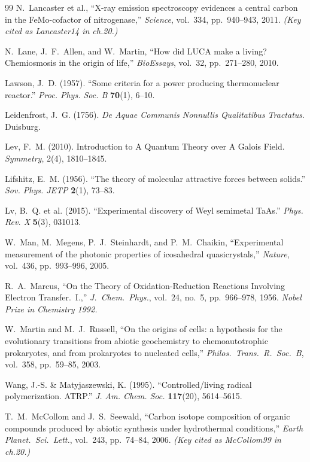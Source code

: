 \documentclass[12pt,oneside]{book}
\theoremstyle{principia}
\theoremstyle{definition}
\theoremstyle{remark}
\begin{document}
\begin{thebibliography}{99}
N.~Lancaster et al.,
``X-ray emission spectroscopy evidences a central carbon in the FeMo-cofactor of nitrogenase,''
\emph{Science}, vol.~334, pp.~940--943, 2011.
\textit{(Key cited as Lancaster14 in ch.20.)}

N.~Lane, J.~F.~Allen, and W.~Martin,
``How did LUCA make a living? Chemiosmosis in the origin of life,''
\emph{BioEssays}, vol.~32, pp.~271--280, 2010.

Lawson, J.~D. (1957).
``Some criteria for a power producing thermonuclear reactor.''
\textit{Proc. Phys. Soc. B} \textbf{70}(1), 6--10.

Leidenfrost, J.~G. (1756).
\textit{De Aquae Communis Nonnullis Qualitatibus Tractatus}. Duisburg.

Lev, F.~M. (2010).
Introduction to A Quantum Theory over A Galois Field.
\textit{Symmetry}, 2(4), 1810--1845.

Lifshitz, E.~M. (1956).
``The theory of molecular attractive forces between solids.''
\textit{Sov. Phys. JETP} \textbf{2}(1), 73--83.

Lv, B.~Q. et al. (2015).
``Experimental discovery of Weyl semimetal TaAs.''
\textit{Phys. Rev. X} \textbf{5}(3), 031013.

W.~Man, M.~Megens, P.~J.~Steinhardt, and P.~M.~Chaikin,
``Experimental measurement of the photonic properties of icosahedral quasicrystals,''
\emph{Nature}, vol.~436, pp.~993--996, 2005.

R.~A.~Marcus,
``On the Theory of Oxidation-Reduction Reactions Involving Electron Transfer.\ I.,''
\emph{J.\ Chem.\ Phys.}, vol.~24, no.~5, pp.~966--978, 1956.
\textit{Nobel Prize in Chemistry 1992.}

W.~Martin and M.~J.~Russell,
``On the origins of cells: a hypothesis for the evolutionary transitions from
abiotic geochemistry to chemoautotrophic prokaryotes, and from prokaryotes to
nucleated cells,''
\emph{Philos.\ Trans.\ R.\ Soc.\ B}, vol.~358, pp.~59--85, 2003.

Wang, J.-S. \& Matyjaszewski, K. (1995).
``Controlled/living radical polymerization. ATRP.''
\textit{J. Am. Chem. Soc.} \textbf{117}(20), 5614--5615.

T.~M.~McCollom and J.~S.~Seewald,
``Carbon isotope composition of organic compounds produced by abiotic synthesis under hydrothermal conditions,''
\emph{Earth Planet.\ Sci.\ Lett.}, vol.~243, pp.~74--84, 2006.
\textit{(Key cited as McCollom99 in ch.20.)}


\end{thebibliography}
\end{document}
